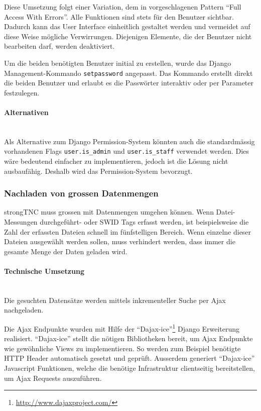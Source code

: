 Diese Umsetzung folgt einer Variation, dem in \cite{posa1} vorgeschlagenen Pattern \enquote{Full Access With Errors}. Alle Funktionen sind stets für den Benutzer sichtbar. Dadurch kann das User Interface einheitlich gestaltet werden und vermeidet auf diese Weise mögliche Verwirrungen. Diejenigen Elemente, die der Benutzer nicht bearbeiten darf, werden deaktiviert. 

Um die beiden benötigten Benutzer initial zu erstellen, wurde das Django
Management-Kommando \texttt{setpassword} angepasst. Das Kommando erstellt direkt
die beiden Benutzer und erlaubt es die Passwörter interaktiv oder per Parameter
festzulegen.

\paragraph{Alternativen} \hspace{0px} \\
Als Alternative zum Django Permission-System könnten auch die standardmässig
vorhandenen Flags \texttt{user.is\_admin} und \texttt{user.is\_staff} verwendet
werden. Dies wäre bedeutend einfacher zu implementieren, jedoch ist die Lösung
nicht ausbaufähig. Deshalb wird das Permission-System bevorzugt.

\subsubsection{Nachladen von grossen Datenmengen}
strongTNC muss grossen mit Datenmengen umgehen können. Wenn Datei-Messungen
durchgeführt- oder SWID Tags erfasst werden, ist beispielsweise die Zahl der
erfassten Dateien schnell im fünfstelligen Bereich. Wenn einzelne dieser Dateien
ausgewählt werden sollen, muss verhindert werden, dass immer die gesamte Menge
der Daten geladen wird.

\paragraph{Technische Umsetzung} \hspace{0pt} \\
Die gesuchten Datensätze werden mittels inkrementeller Suche per Ajax
nachgeladen.

Die Ajax Endpunkte wurden mit Hilfe der \enquote{Dajax-ice}\footnote{\url{http://www.dajaxproject.com/}} Django Erweiterung realisiert.
\enquote{Dajax-ice} stellt die nötigen Bibliotheken bereit, um Ajax Endpunkte wie gewöhnliche Views zu implementieren. So werden zum Beispiel benötigte HTTP Header
automatisch gesetzt und geprüft. Ausserdem generiert \enquote{Dajax-ice} Javascript Funktionen, welche die benötige Infrastruktur clientseitig bereitstellen, um Ajax Requests auszuführen.
\\

